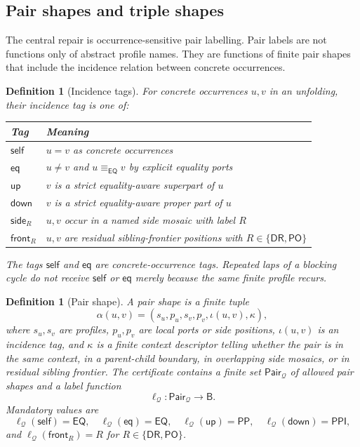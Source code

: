 \documentclass[11pt]{article}
\newtheorem{definition}[theorem]{Definition}
\newcommand{\Base}{\mathsf B}
\newcommand{\EQ}{\mathsf{EQ}}
\newcommand{\DR}{\mathsf{DR}}
\newcommand{\PO}{\mathsf{PO}}
\newcommand{\PP}{\mathsf{PP}}
\newcommand{\PPI}{\mathsf{PPI}}
\newcommand{\Q}{\mathcal Q}
\newcommand{\Pair}{\mathsf{Pair}}
\newcommand{\eqc}{\equiv_{\EQ}}
\newcommand{\up}{\mathsf{up}}
\newcommand{\down}{\mathsf{down}}
\newcommand{\self}{\mathsf{self}}
\newcommand{\eqtag}{\mathsf{eq}}
\newcommand{\side}{\mathsf{side}}
\newcommand{\front}{\mathsf{front}}
\begin{document}
\subsection{Pair shapes and triple shapes}

The central repair is occurrence-sensitive pair labelling.  Pair labels are not functions only of abstract profile names.  They are functions of finite pair shapes that include the incidence relation between concrete occurrences.

\begin{definition}[Incidence tags]\label{def:incidence-tags}
For concrete occurrences $u,v$ in an unfolding, their incidence tag is one of:
\begin{center}
\begin{tabular}{ll}
\toprule
Tag & Meaning \\
\midrule
$\self$ & $u=v$ as concrete occurrences \\
$\eqtag$ & $u\ne v$ and $u\eqc v$ by explicit equality ports \\
$\up$ & $v$ is a strict equality-aware superpart of $u$ \\
$\down$ & $v$ is a strict equality-aware proper part of $u$ \\
$\side_R$ & $u,v$ occur in a named side mosaic with label $R$ \\
$\front_R$ & $u,v$ are residual sibling-frontier positions with $R\in\{\DR,\PO\}$ \\
\bottomrule
\end{tabular}
\end{center}
The tags $\self$ and $\eqtag$ are concrete-occurrence tags.  Repeated laps of a blocking cycle do not receive $\self$ or $\eqtag$ merely because the same finite profile recurs.
\end{definition}

\begin{definition}[Pair shape]\label{def:pair-shape}
A pair shape is a finite tuple
\[
  \alpha(u,v)=(s_u,p_u,s_v,p_v,\iota(u,v),\kappa),
\]
where $s_u,s_v$ are profiles, $p_u,p_v$ are local ports or side positions, $\iota(u,v)$ is an incidence tag, and $\kappa$ is a finite context descriptor telling whether the pair is in the same context, in a parent-child boundary, in overlapping side mosaics, or in residual sibling frontier.  The certificate contains a finite set $\Pair_\Q$ of allowed pair shapes and a label function
\[
   \ell_\Q:\Pair_\Q\to\Base.
\]
Mandatory values are
\[
 \ell_\Q(\self)=\EQ,
 \quad
 \ell_\Q(\eqtag)=\EQ,
 \quad
 \ell_\Q(\up)=\PP,
 \quad
 \ell_\Q(\down)=\PPI,
\]
and $\ell_\Q(\front_R)=R$ for $R\in\{\DR,\PO\}$.
\end{definition}
\end{document}
